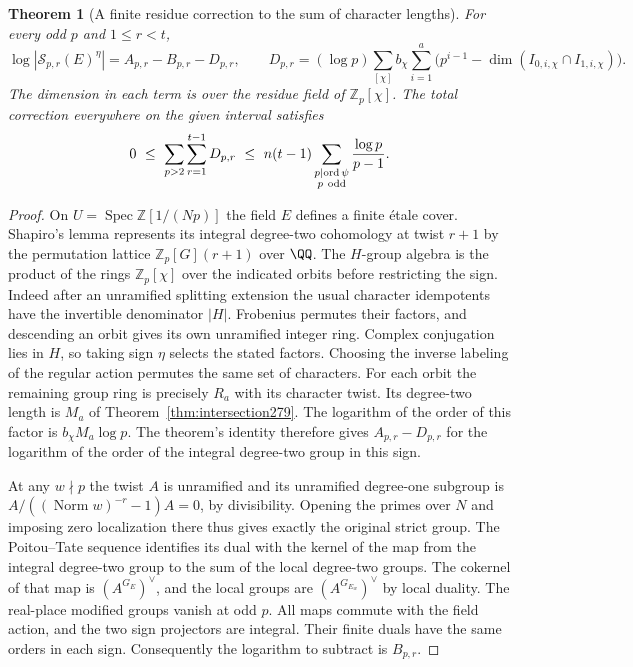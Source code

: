 \documentclass[a4paper,11pt]{article}
\newtheorem{theorem}[proposition]{Theorem}
\theoremstyle{definition}
\theoremstyle{remark}
\newcommand{\ZZ}{\mathbb Z}\newcommand{\ord}{\operatorname{ord}}
\numberwithin{equation}{section}
\begin{document}
\begin{theorem}[A finite residue correction to the sum of character lengths]\leavevmode
\label{thm:common279}
For every odd \(p\) and \(1\le r<t\),
\[
 \log|\mathcal S_{p,r}(E)^\eta|
       = A_{p,r}-B_{p,r}-D_{p,r},
 \qquad
 D_{p,r}=(\log p)\sum_{[\chi]} b_\chi
       \sum_{i=1}^a
       \bigl(p^{i-1}-\dim(I_{0,i,\chi}\cap I_{1,i,\chi})\bigr).
\]
The dimension in each term is over the residue field of
\(\ZZ_p[\chi]\). The total correction everywhere on the given
interval satisfies
\[
  0\ \le\ \sum_{p>2}\sum_{r=1}^{t-1}D_{p,r}
   \ \le\ n(t-1)
     \sum_{\substack{p\mid\operatorname{ord}\psi\\p\ {\rm odd}}}
                           \frac{\log p}{p-1}.
\]
\end{theorem}
\begin{proof}
On \(U=\operatorname{Spec}\ZZ[1/(Np)]\) the field \(E\)
defines a finite étale cover. Shapiro's lemma represents its
integral degree-two cohomology at twist \(r+1\) by the
permutation lattice \(\ZZ_p[G](r+1)\) over \(\QQ\).
The \(H\)-group algebra is the product of the rings
\(\ZZ_p[\chi]\) over the indicated orbits before restricting
the sign. Indeed after an unramified splitting extension the
usual character idempotents have the invertible denominator
\(|H|\). Frobenius permutes their factors, and descending an orbit gives
its own unramified integer ring. Complex conjugation lies in
\(H\), so taking sign \(\eta\) selects the stated factors.
Choosing the inverse labeling of the regular action permutes
the same set of characters. For each orbit the remaining group
ring is precisely \(R_a\) with its character twist. Its
degree-two length is \(M_a\) of
Theorem~\ref{thm:intersection279}. The logarithm of the order
of this factor is \(b_\chi M_a\log p\). The theorem's identity
therefore gives \(A_{p,r}-D_{p,r}\) for the logarithm of the
order of the integral degree-two group in this sign.

At any \(w\nmid p\) the twist \(A\) is unramified and its
unramified degree-one subgroup is
\(A/((\operatorname{Norm}w)^{-r}-1)A=0\), by divisibility.
Opening the primes over \(N\) and imposing zero localization
there thus gives exactly the original strict group. The
Poitou--Tate sequence identifies its dual with the kernel of
the map from the integral degree-two group to the sum of the
local degree-two groups. The cokernel of that map is
\((A^{G_E})^\vee\), and the local groups are
\((A^{G_{E_w}})^\vee\) by local duality. The real-place
modified groups vanish at odd \(p\). All maps commute with
the field action, and the two sign projectors are integral.
Their finite duals have the same orders in each sign.
Consequently the logarithm to subtract is \(B_{p,r}\).


\end{proof}
\end{document}

